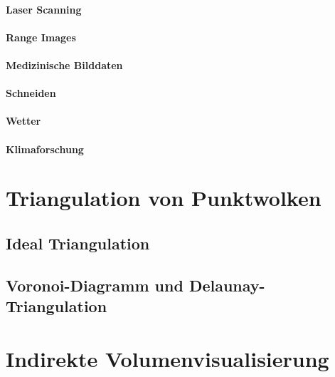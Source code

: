 \documentclass[a4paper, 11pt, accentcolor = tud3b]{tudreport}
\begin{document}
			\paragraph{Laser Scanning} %

			\paragraph{Range Images} %

			\paragraph{Medizinische Bilddaten} %

			\paragraph{Schneiden} %

			\paragraph{Wetter} %

			\paragraph{Klimaforschung} %

		\section{Triangulation von Punktwolken} %

			\subsection{Ideal Triangulation} %

			\subsection{Voronoi-Diagramm und Delaunay-Triangulation} %

		\section{Indirekte Volumenvisualisierung} %
\end{document}
